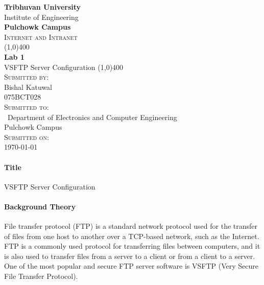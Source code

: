 \documentclass[12pt]{article}
\begin{document}
\begin{titlepage}
    \begin{center}
        \huge{\bfseries  Tribhuvan University}\\
        \Large{Institute of Engineering}\\
        \huge{ \bfseries  Pulchowk Campus}\\[3.2cm]


        \textsc{\Large Internet and Intranet}\\[-0.5cm]
        \line(1,0){400}\\
        \huge{\bfseries Lab 1}\\
        \large{VSFTP Server Configuration}
        \line(1,0){400}\\


        \textsc{\Large Submitted by:}\\
        \Large Bishal Katuwal\\ \large 075BCT028\\    [0.85cm]

        \textsc{\Large Submitted to:}\\\
        \large Department of Electronics and Computer Engineering\\Pulchowk Campus\\    [0.85cm]
        
        \textsc{\Large Submitted on:}\\
        \today
        
    \end{center}
\end{titlepage}
\pagebreak
\paragraph{\Large Title\\}
VSFTP Server Configuration

\paragraph{Background Theory\\}
File transfer protocol (FTP) is a standard network protocol 
used for the transfer of files from one host to another over 
a TCP-based network, such as the Internet. FTP is a commonly 
used protocol for transferring files between computers, and 
it is also used to transfer files from a server to a client 
or from a client to a server. One of the most popular and 
secure FTP server software is VSFTP (Very Secure File Transfer 
Protocol).
\end{document}
